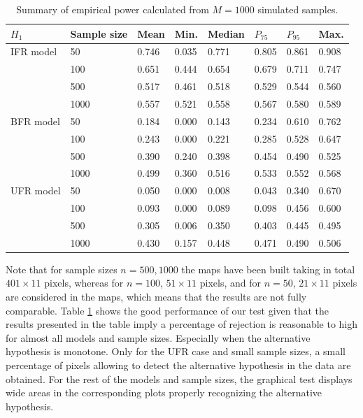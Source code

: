 \documentclass[preprint,12pt]{elsarticle}
\begin{document}
\begin{table}[htb]
\centering
\caption{Summary of empirical power calculated from $M=1000$ simulated samples.}
{\begin{tabular}{llllllll}
  $H_1$   & Sample size &   Mean & Min. & Median   & $P_{75}$ & $P_{95}$& Max.\\
\hline
IFR model &50        & 0.746& 0.035 & 0.771 & 0.805  & 0.861 & 0.908\\
          &100       & 0.651& 0.444 & 0.654 & 0.679  & 0.711 & 0.747\\
          &500       & 0.517& 0.461 & 0.518 & 0.529  & 0.544 & 0.560\\
          &1000      & 0.557& 0.521 & 0.558 & 0.567  & 0.580 & 0.589\\ \hline
BFR model &50        & 0.184& 0.000 & 0.143 & 0.234  & 0.610 & 0.762\\
          &100       & 0.243& 0.000 & 0.221 & 0.285  & 0.528 & 0.647\\
          &500       & 0.390& 0.240 & 0.398 & 0.454  & 0.490 & 0.525\\
          &1000      &0.499 & 0.360  & 0.516 & 0.533  & 0.552 & 0.568\\ \hline
UFR model &50        &0.050 & 0.000 & 0.008 & 0.043  & 0.340 & 0.670\\
          &100       &0.093 & 0.000  & 0.089 & 0.098  & 0.456 & 0.600 \\
          &500       &0.305 & 0.006  & 0.350 & 0.403  & 0.445 & 0.495\\
          &1000      &0.430 & 0.157  & 0.448 & 0.471  & 0.490 & 0.506\\ \hline

\end{tabular}}
\label{Tab:power}
\end{table}

Note that for sample sizes $n=500, 1000$ the maps have been built taking in total $401 \times 11$ pixels, whereas for $n=100$, $51 \times 11$ pixels, and for $n=50$, $21 \times 11$ pixels are considered in the maps, which means that the results are not fully comparable. Table \ref{Tab:power} shows the good performance of our test given that the results presented in the table imply a percentage of rejection is reasonable to high for almost all models and sample sizes. Especially when the alternative hypothesis is monotone. Only for the UFR case and small sample sizes, a small percentage of pixels allowing  to detect the alternative hypothesis in the data are obtained. For the rest of the models and sample sizes, the graphical test displays wide areas in the corresponding plots properly recognizing the alternative hypothesis.
\end{document}
